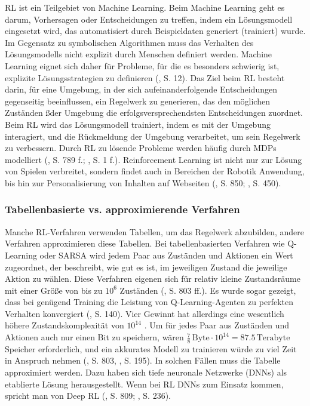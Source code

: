 RL ist ein Teilgebiet von Machine Learning. Beim Machine Learning geht es darum, Vorhersagen oder Entscheidungen zu treffen, indem ein Lösungsmodell eingesetzt wird, das automatisiert durch Beispieldaten generiert (trainiert) wurde. Im Gegensatz zu symbolischen Algorithmen muss das Verhalten des Lösungsmodells nicht explizit durch Menschen definiert werden. Machine Learning eignet sich daher für Probleme, für die es besonders schwierig ist, explizite Lösungsstrategien zu definieren (\cite{Humm.2020}, S. 12). Das Ziel beim RL besteht darin, für eine Umgebung, in der sich aufeinanderfolgende Entscheidungen gegenseitig beeinflussen, ein Regelwerk zu generieren, das den möglichen Zuständen ßder Umgebung die erfolgsversprechendsten Entscheidungen zuordnet. Beim RL wird das Lösungsmodell trainiert, indem es mit der Umgebung interagiert, und die Rückmeldung der Umgebung verarbeitet, um sein Regelwerk zu verbessern. Durch RL zu lösende Probleme werden häufig durch MDPs modelliert (\cite{Russell.2020}, S. 789 f.; \cite{Sutton.2018}, S. 1 f.). Reinforcement Learning ist nicht nur zur Lösung von Spielen verbreitet, sondern findet auch in Bereichen der Robotik Anwendung, bis hin zur Personalisierung von Inhalten auf Webseiten (\cite{Russell.2020}, S. 850; \cite{Sutton.2018}, S. 450).

\subsubsection{Tabellenbasierte vs. approximierende Verfahren}

Manche RL-Verfahren verwenden Tabellen, um das Regelwerk abzubilden, andere Verfahren approximieren diese Tabellen. Bei tabellenbasierten Verfahren wie Q-Learning oder SARSA wird jedem Paar aus Zuständen und Aktionen ein Wert zugeordnet, der beschreibt, wie gut es ist, im jeweiligen Zustand die jeweilige Aktion zu wählen. Diese Verfahren eigenen sich für relativ kleine Zustandsräume mit einer Größe von bis zu $10^{6}$ Zuständen (\cite{Russell.2020}, S. 803 ff.). Es wurde sogar gezeigt, dass bei genügend Training die Leistung von Q-Learning-Agenten zu perfekten Verhalten konvergiert (\cite{Sutton.2018}, S. 140). Vier Gewinnt hat allerdings eine wesentlich höhere Zustandskomplexität von $10^{14}$ \cite{Allis.1994}. Um für jedes Paar aus Zuständen und Aktionen auch nur einen Bit zu speichern, wären $\frac{7}{8} \, \text{Byte} \cdot 10^{14} = 87.5 \, \text{Terabyte}$ Speicher erforderlich, und ein akkurates Modell zu trainieren würde zu viel Zeit in Anspruch nehmen (\cite{Russell.2020}, S. 803, \cite{Sutton.2018}, S. 195). In solchen Fällen muss die Tabelle approximiert werden. Dazu haben sich tiefe neuronale Netzwerke (DNNs) als etablierte Lösung herausgestellt. Wenn bei RL DNNs zum Einsatz kommen, spricht man von Deep RL (\cite{Russell.2020}, S. 809; \cite{Sutton.2018}, S. 236).

